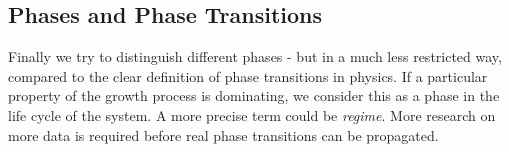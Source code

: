 \documentclass[a4paper,10pt]{scrbook}
\begin{document}
%









\subsection{Phases and Phase Transitions}
Finally we try to distinguish different phases - but in a much less restricted way, compared to the clear definition of phase transitions in physics. If a particular property of the growth process is dominating, we consider this as a phase in the life cycle of the system. A more precise term could be \textit{regime}. More research on more data is required before real phase transitions can be propagated.
 
\end{document}

